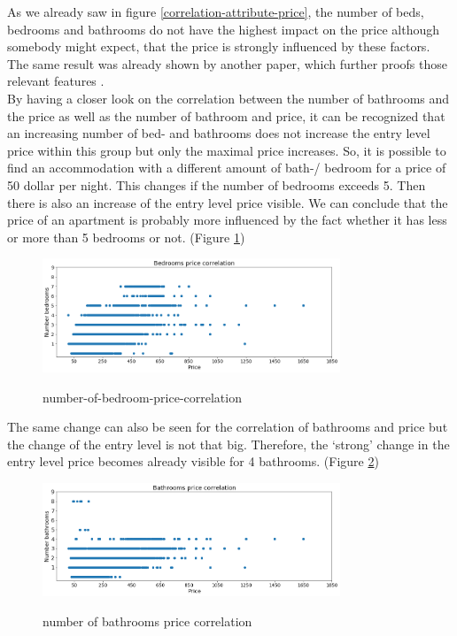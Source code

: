 \documentclass[journal]{IEEEtran}
\begin{document}
As we already saw in figure \ref{correlation-attribute-price}, the number of beds, bedrooms and bathrooms do not have the highest impact on the price although somebody might expect, that the price is strongly influenced by these factors. \\
The same result was already shown by another paper, which further proofs those relevant features \cite{RN1}.\\ By having a closer look on the correlation between the number of bathrooms and the price as well as the number of bathroom and price, it can be recognized that an increasing number of bed- and bathrooms does not increase the entry level price within this group but only the maximal price increases. So, it is possible to find an accommodation with a different amount of bath-/ bedroom for a price of 50 dollar per night. This changes if the number of bedrooms exceeds 5. Then there is also an increase of the entry level price visible. We can conclude that the price of an apartment is probably more influenced by the fact whether it has less or more than 5 bedrooms or not. (Figure \ref{bedroom-price-correlation})
\begin{figure}
  \begin{center}
  \includegraphics[width=3.5in]{photo/10_bedrooms_price_correlation.png}\\
  \caption{number-of-bedroom-price-correlation}\label{bedroom-price-correlation}
  \end{center}
\end{figure}
The same change can also be seen for the correlation of bathrooms and price but the change of the entry level is not that big. Therefore, the ‘strong’ change in the entry level price becomes already visible for 4 bathrooms. (Figure \ref{bathrooms-price-correlation})
\begin{figure}
  \begin{center}
  \includegraphics[width=3.5in]{photo/9_bathroom_price_correlation.png}\\
  \caption{number of bathrooms price correlation}\label{bathrooms-price-correlation}
  \end{center}
\end{figure}
\end{document}
